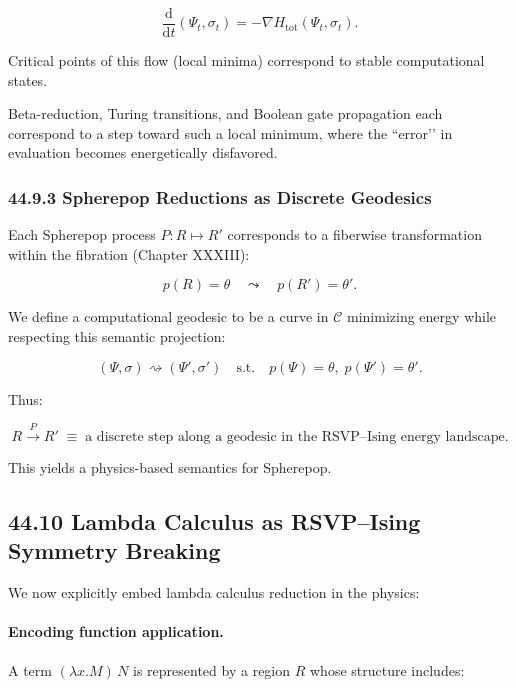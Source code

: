 \documentclass[12pt,letterpaper]{article}
\theoremstyle{remark}
\begin{document}
\[
\frac{\mathrm{d}}{\mathrm{d}t}(\Psi_t,\sigma_t)
= 
- \nabla H_{\text{tot}}(\Psi_t, \sigma_t).
\]

Critical points of this flow (local minima) correspond to stable computational states.

Beta-reduction, Turing transitions, and Boolean gate propagation each correspond to a step toward such a local minimum, where the ``error’’ in evaluation becomes energetically disfavored.

\subsubsection{44.9.3 Spherepop Reductions as Discrete Geodesics}

Each Spherepop process $P : R \mapsto R'$ corresponds to a fiberwise transformation within the fibration (Chapter XXXIII):

\[
p(R) = \theta
\quad\leadsto\quad
p(R') = \theta'.
\]

We define a computational geodesic to be a curve in $\mathcal{C}$ minimizing energy while respecting this semantic projection:

\[
(\Psi,\sigma) \rightsquigarrow (\Psi',\sigma')
\quad\text{s.t.}\quad
p(\Psi) = \theta,\; p(\Psi') = \theta'.
\]

Thus:

\[
\boxed{
R \xrightarrow{P} R'
\;\equiv\;
\text{a discrete step along a geodesic in the RSVP--Ising energy landscape.}
}
\]

This yields a physics-based semantics for Spherepop.

\subsection{44.10 Lambda Calculus as RSVP–Ising Symmetry Breaking}

We now explicitly embed lambda calculus reduction in the physics:

\paragraph{Encoding function application.}
A term $(\lambda x.M)\,N$ is represented by a region $R$ whose structure includes:
\end{document}
